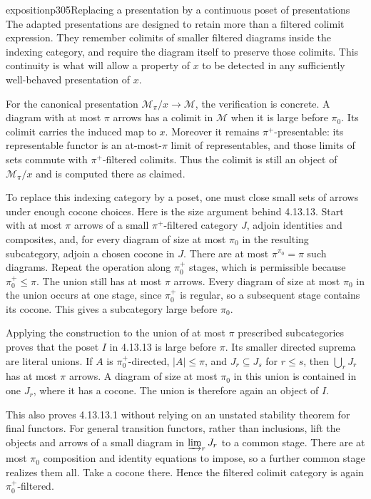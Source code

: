 \begin{dcomment}{exposition}{p305}{Replacing a presentation by a continuous poset of presentations}
The adapted presentations are designed to retain more than a filtered colimit expression. They remember colimits of smaller filtered diagrams inside the indexing category, and require the diagram itself to preserve those colimits. This continuity is what will allow a property of $x$ to be detected in any sufficiently well-behaved presentation of $x$.

For the canonical presentation $\mathcal M_\pi/x\to\mathcal M$, the verification is concrete. A diagram with at most $\pi$ arrows has a colimit in $\mathcal M$ when it is large before $\pi_0$. Its colimit carries the induced map to $x$. Moreover it remains $\pi^+$-presentable: its representable functor is an at-most-$\pi$ limit of representables, and those limits of sets commute with $\pi^+$-filtered colimits. Thus the colimit is still an object of $\mathcal M_\pi/x$ and is computed there as claimed.

To replace this indexing category by a poset, one must close small sets of arrows under enough cocone choices. Here is the size argument behind 4.13.13. Start with at most $\pi$ arrows of a small $\pi^+$-filtered category $J$, adjoin identities and composites, and, for every diagram of size at most $\pi_0$ in the resulting subcategory, adjoin a chosen cocone in $J$. There are at most $\pi^{\pi_0}=\pi$ such diagrams. Repeat the operation along $\pi_0^+$ stages, which is permissible because $\pi_0^+\leq\pi$. The union still has at most $\pi$ arrows. Every diagram of size at most $\pi_0$ in the union occurs at one stage, since $\pi_0^+$ is regular, so a subsequent stage contains its cocone. This gives a subcategory large before $\pi_0$.

Applying the construction to the union of at most $\pi$ prescribed subcategories proves that the poset $I$ in 4.13.13 is large before $\pi$. Its smaller directed suprema are literal unions. If $A$ is $\pi_0^+$-directed, $|A|\leq\pi$, and $J_r\subseteq J_s$ for $r\leq s$, then $\bigcup_rJ_r$ has at most $\pi$ arrows. A diagram of size at most $\pi_0$ in this union is contained in one $J_r$, where it has a cocone. The union is therefore again an object of $I$.

This also proves 4.13.13.1 without relying on an unstated stability theorem for final functors. For general transition functors, rather than inclusions, lift the objects and arrows of a small diagram in $\varinjlim_rJ_r$ to a common stage. There are at most $\pi_0$ composition and identity equations to impose, so a further common stage realizes them all. Take a cocone there. Hence the filtered colimit category is again $\pi_0^+$-filtered.


\end{dcomment}
